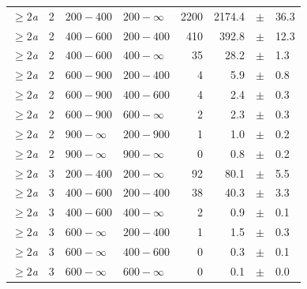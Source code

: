 \begin{table}[!h]
\begin{tabular}{rrllrrcl}
$\geq 2${\it a}\T & 2 & $ 200- 400$ & $200-\infty$ &   2200 &   2174.4 &$\pm$&   36.3 \\
$\geq 2${\it a}\T & 2 & $ 400- 600$ & $200-400$ &    410 &    392.8 &$\pm$&   12.3 \\
$\geq 2${\it a} & 2 & $ 400- 600$ & $400-\infty$ &     35 &     28.2 &$\pm$&    1.3 \\
$\geq 2${\it a}\T & 2 & $ 600- 900$ & $200-400$ &      4 &      5.9 &$\pm$&    0.8 \\
$\geq 2${\it a} & 2 & $ 600- 900$ & $400-600$ &      4 &      2.4 &$\pm$&    0.3 \\
$\geq 2${\it a} & 2 & $ 600- 900$ & $600-\infty$ &      2 &      2.3 &$\pm$&    0.3 \\
$\geq 2${\it a}\T & 2 & $ 900- \infty$ & $200-900$ &      1 &      1.0 &$\pm$&    0.2 \\
$\geq 2${\it a} & 2 & $ 900- \infty$ & $900-\infty$ &      0 &      0.8 &$\pm$&    0.2 \\
$\geq 2${\it a}\T & 3 & $ 200- 400$ & $200-\infty$ &     92 &     80.1 &$\pm$&    5.5 \\
$\geq 2${\it a}\T & 3 & $ 400- 600$ & $200-400$ &     38 &     40.3 &$\pm$&    3.3 \\
$\geq 2${\it a} & 3 & $ 400- 600$ & $400-\infty$ &      2 &      0.9 &$\pm$&    0.1 \\
$\geq 2${\it a}\T & 3 & $ 600- \infty$ & $200-400$ &      1 &      1.5 &$\pm$&    0.3 \\
$\geq 2${\it a} & 3 & $ 600- \infty$ & $400-600$ &      0 &      0.3 &$\pm$&    0.1 \\
$\geq 2${\it a} & 3 & $ 600- \infty$ & $600-\infty$ &      0 &      0.1 &$\pm$&    0.0 \\
    \hline
  \end{tabular}
\end{table}

